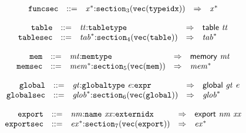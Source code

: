$$
\begin{array}{@{}l@{}rrlll@{}l@{}}
& {\mathtt{funcsec}} &::=& {{\mathit{x}}^\ast}{:}{{\mathtt{section}}}_{3}({\mathtt{vec}}({\mathtt{typeidx}})) &\Rightarrow& {{\mathit{x}}^\ast} \\
\end{array}
$$

\vspace{1ex}

$$
\begin{array}{@{}l@{}rrlll@{}l@{}}
& {\mathtt{table}} &::=& {\mathit{tt}}{:}{\mathtt{tabletype}} &\Rightarrow& \mathsf{table}~{\mathit{tt}} \\
& {\mathtt{tablesec}} &::=& {{\mathit{tab}}^\ast}{:}{{\mathtt{section}}}_{4}({\mathtt{vec}}({\mathtt{table}})) &\Rightarrow& {{\mathit{tab}}^\ast} \\
\end{array}
$$

\vspace{1ex}

$$
\begin{array}{@{}l@{}rrlll@{}l@{}}
& {\mathtt{mem}} &::=& {\mathit{mt}}{:}{\mathtt{memtype}} &\Rightarrow& \mathsf{memory}~{\mathit{mt}} \\
& {\mathtt{memsec}} &::=& {{\mathit{mem}}^\ast}{:}{{\mathtt{section}}}_{5}({\mathtt{vec}}({\mathtt{mem}})) &\Rightarrow& {{\mathit{mem}}^\ast} \\
\end{array}
$$

\vspace{1ex}

$$
\begin{array}{@{}l@{}rrlll@{}l@{}}
& {\mathtt{global}} &::=& {\mathit{gt}}{:}{\mathtt{globaltype}}~{\mathit{e}}{:}{\mathtt{expr}} &\Rightarrow& \mathsf{global}~{\mathit{gt}}~{\mathit{e}} \\
& {\mathtt{globalsec}} &::=& {{\mathit{glob}}^\ast}{:}{{\mathtt{section}}}_{6}({\mathtt{vec}}({\mathtt{global}})) &\Rightarrow& {{\mathit{glob}}^\ast} \\
\end{array}
$$

\vspace{1ex}

$$
\begin{array}{@{}l@{}rrlll@{}l@{}}
& {\mathtt{export}} &::=& {\mathit{nm}}{:}{\mathtt{name}}~{\mathit{xx}}{:}{\mathtt{externidx}} &\Rightarrow& \mathsf{export}~{\mathit{nm}}~{\mathit{xx}} \\
& {\mathtt{exportsec}} &::=& {{\mathit{ex}}^\ast}{:}{{\mathtt{section}}}_{7}({\mathtt{vec}}({\mathtt{export}})) &\Rightarrow& {{\mathit{ex}}^\ast} \\
\end{array}
$$

